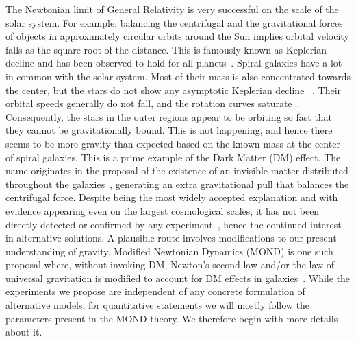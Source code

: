 \documentclass[aps,prl,reprint,superscriptaddress,nofootinbib,floatfix]{revtex4-2}
\begin{document}
\maketitle


The Newtonian limit of General Relativity is very successful on the scale of the solar system.
For example, balancing the centrifugal and the gravitational forces of objects in approximately circular orbits around the Sun implies orbital velocity falls as the square root of the distance. 
This is famously known as Keplerian decline and has been observed to hold for all planets~\cite{NASA-PlanetFactSheet-rel2Earth}.
Spiral galaxies have a lot in common with the solar system. 
Most of their mass is also concentrated towards the center, but the stars do not show any asymptotic Keplerian decline ~\cite{book-DM-Sanders2010}. 
Their orbital speeds generally do not fall, and the rotation curves saturate~\cite{Andromeda-Babock1939}.
Consequently, the stars in the outer regions appear to be orbiting so fast that they cannot be gravitationally bound.
This is not happening, and hence there seems to be more gravity than expected based on the known mass at the center of spiral galaxies. 
This is a prime example of the Dark Matter (DM) effect. The name originates in the proposal of the existence of an invisible matter distributed throughout the galaxies~\cite{ComaCluster-Zwicky1937}, generating an extra gravitational pull that balances the centrifugal force.
Despite being the most widely accepted explanation and with evidence appearing even on the largest cosmological scales, it has not been directly detected or confirmed by any experiment~\cite{DM-Review-Bertone2018}, hence the continued interest in alternative solutions.
A plausible route involves modifications to our present understanding of gravity.
Modified Newtonian Dynamics (MOND) is one such proposal where, without invoking DM, Newton's second law and/or the law of universal gravitation is modified to account for DM effects in galaxies~\cite{MOND-Milogram1983}.
While the experiments we propose are independent of any concrete formulation of alternative models, for quantitative statements we will mostly follow the parameters present in the MOND theory. We therefore begin with more details about it.
\end{document}
